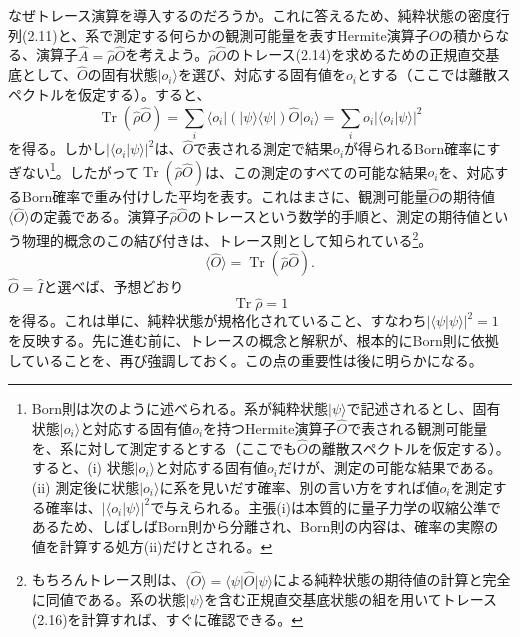 なぜトレース演算を導入するのだろうか。これに答えるため、純粋状態の密度行列(2.11)と、系で測定する何らかの観測可能量を表すHermite演算子$\hat O$の積からなる、演算子$\hat A=\hat\rho\hat O$を考えよう。$\hat\rho\hat O$のトレース(2.14)を求めるための正規直交基底として、$\hat O$の固有状態$\lvert o_i\rangle$を選び、対応する固有値を$o_i$とする（ここでは離散スペクトルを仮定する）。すると、
\begin{equation}\operatorname{Tr}(\hat\rho\hat O)=\sum_i\langle o_i\rvert(\lvert\psi\rangle\langle\psi\rvert)\hat O\lvert o_i\rangle=\sum_i o_i\lvert\langle o_i\vert\psi\rangle\rvert^2\tag{2.16}\end{equation}
を得る。しかし$\lvert\langle o_i\vert\psi\rangle\rvert^2$は、$\hat O$で表される測定で結果$o_i$が得られるBorn確率にすぎない\footnote{Born則\cite{ref019}は次のように述べられる。系が純粋状態$\lvert\psi\rangle$で記述されるとし、固有状態$\lvert o_i\rangle$と対応する固有値$o_i$を持つHermite演算子$\hat O$で表される観測可能量を、系に対して測定するとする（ここでも$\hat O$の離散スペクトルを仮定する）。すると、(i) 状態$\lvert o_i\rangle$と対応する固有値$o_i$だけが、測定の可能な結果である。(ii) 測定後に状態$\lvert o_i\rangle$に系を見いだす確率、別の言い方をすれば値$o_i$を測定する確率は、$\lvert\langle o_i\vert\psi\rangle\rvert^2$で与えられる。主張(i)は本質的に量子力学の収縮公準であるため、しばしばBorn則から分離され、Born則の内容は、確率の実際の値を計算する処方(ii)だけとされる。}。したがって$\operatorname{Tr}(\hat\rho\hat O)$は、この測定のすべての可能な結果$o_i$を、対応するBorn確率で重み付けした平均を表す。これはまさに、観測可能量$\hat O$の期待値$\langle\hat O\rangle$の定義である。演算子$\hat\rho\hat O$のトレースという数学的手順と、測定の期待値という物理的概念のこの結び付きは、トレース則として知られている\footnote{もちろんトレース則は、$\langle\hat O\rangle=\langle\psi\rvert\hat O\lvert\psi\rangle$による純粋状態の期待値の計算と完全に同値である。系の状態$\lvert\psi\rangle$を含む正規直交基底状態の組を用いてトレース(2.16)を計算すれば、すぐに確認できる。}。
\hypertarget{srcpage:36}{}\label{srcpage:36}
\begin{equation}\langle\hat O\rangle=\operatorname{Tr}(\hat\rho\hat O).\tag{2.17}\end{equation}
$\hat O=\hat I$と選べば、予想どおり
\begin{equation}\operatorname{Tr}\hat\rho=1\tag{2.18}\end{equation}
を得る。これは単に、純粋状態が規格化されていること、すなわち$\lvert\langle\psi\vert\psi\rangle\rvert^2=1$を反映する。先に進む前に、トレースの概念と解釈が、根本的にBorn則に依拠していることを、再び強調しておく。この点の重要性は後に明らかになる。


